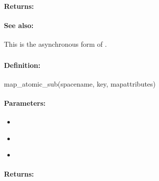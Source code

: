 \paragraph{Returns:}


\paragraph{See also:}  This is the asynchronous form of .

\pagebreak
\subsubsection{}
\label{api:ruby:map_atomic_sub}


\paragraph{Definition:}
\begin{rubycode}
map_atomic_sub(spacename, key, mapattributes)
\end{rubycode}

\paragraph{Parameters:}
\begin{itemize}[noitemsep]
\item {}\\

\item {}\\

\item {}\\

\end{itemize}

\paragraph{Returns:}


\pagebreak
\subsubsection{}
\label{api:ruby:async_map_atomic_sub}


